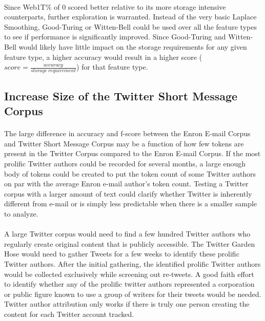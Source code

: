 	\paragraph*{} Since Web1T\% of 0 scored better relative to its more storage intensive counterparts, further exploration is warranted.  Instead of the very basic Laplace Smoothing, Good-Turing or Witten-Bell could be used over all the feature types to see if performance is significantly improved.  Since Good-Turing and Witten-Bell would likely have little impact on the storage requirements for any given feature type, a higher accuracy would result in a higher score ($score=\frac{accuracy}{storage \medspace requirement}$) for that feature type.

	\subsection{Increase Size of the Twitter Short Message Corpus}
		\paragraph*{} The large difference in accuracy and f-score between the Enron E-mail Corpus and Twitter Short Message Corpus may be a function of how few tokens are present in the Twitter Corpus compared to the Enron E-mail Corpus.  If the most prolific Twitter authors could be recorded for several months, a large enough body of tokens could be created to put the token count of some Twitter authors on par with the average Enron e-mail author's token count.  Testing a Twitter corpus with a larger amount of text could clarify whether Twitter is inherently different from e-mail or is simply less predictable when there is a smaller sample to analyze.
		\paragraph*{} A large Twitter corpus would need to find a few hundred Twitter authors who regularly create original content that is publicly accessible.  The Twitter Garden Hose would need to gather Tweets for a few weeks to identify these prolific Twitter authors.  After the initial gathering, the identified prolific Twitter authors would be collected exclusively while screening out re-tweets.  A good faith effort to identify whether any of the prolific twitter authors represented a corporation or public figure known to use a group of writers for their tweets would be needed.  Twitter author attribution only works if there is truly one person creating the content for each Twitter account tracked.
